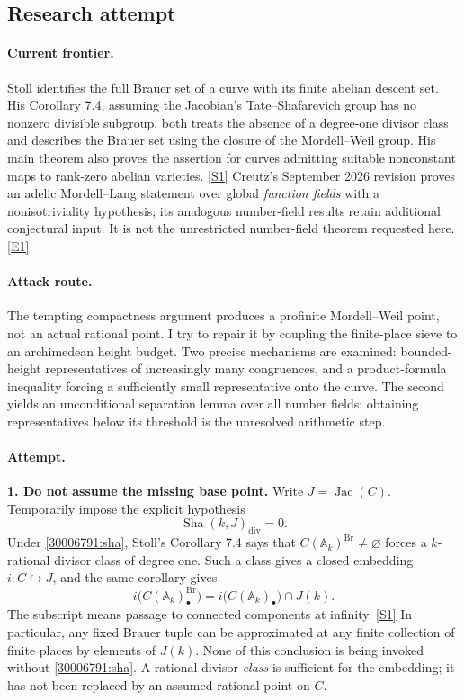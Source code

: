 \documentclass[11pt,a4paper]{article}
\newcommand{\A}{\mathbb{A}}
\newcommand{\sref}[2]{\hyperlink{source:#1:#2}{[S#2]}}
\newcommand{\eref}[2]{\hyperlink{extra:#1:#2}{[E#2]}}
\begin{document}
\subsection{Research attempt}

\paragraph{Current frontier.}
Stoll identifies the full Brauer set of a curve with its finite abelian
descent set. His Corollary 7.4, assuming the Jacobian's Tate--Shafarevich
group has no nonzero divisible subgroup, both treats the absence of a
degree-one divisor class and describes the Brauer set using the closure
of the Mordell--Weil group. His main theorem also proves the assertion for
curves admitting suitable nonconstant maps to rank-zero abelian varieties.
\sref{30006791}{1} Creutz's September 2026 revision proves an adelic
Mordell--Lang statement over global \emph{function fields} with a
nonisotriviality hypothesis; its analogous number-field results retain
additional conjectural input. It is not the unrestricted number-field
theorem requested here.\eref{30006791}{1}

\paragraph{Attack route.}
The tempting compactness argument produces a profinite Mordell--Weil point,
not an actual rational point. I try to repair it by coupling the finite-place
sieve to an archimedean height budget. Two precise mechanisms are examined:
bounded-height representatives of increasingly many congruences, and a
product-formula inequality forcing a sufficiently small representative
onto the curve. The second yields an unconditional separation lemma over
all number fields; obtaining representatives below its threshold is the
unresolved arithmetic step.

\paragraph{Attempt.}
\textbf{1. Do not assume the missing base point.}
Write $J=\operatorname{Jac}(C)$. Temporarily impose the explicit hypothesis
\begin{equation}\label{30006791:sha}
 \operatorname{Sha}(k,J)_{\mathrm{div}}=0.
\end{equation}
Under \eqref{30006791:sha}, Stoll's Corollary 7.4 says that
$C(\A_k)^{\operatorname{Br}}\ne\varnothing$ forces a $k$-rational divisor
class of degree one. Such a class gives a closed embedding $i:C\hookrightarrow J$,
and the same corollary gives
\[
 i\bigl(C(\A_k)^{\operatorname{Br}}_\bullet\bigr)
 =i\bigl(C(\A_k)_\bullet\bigr)\cap\overline{J(k)}.
\]
The subscript means passage to connected components at infinity.
\sref{30006791}{1} In particular, any fixed Brauer tuple can be approximated
at any finite collection of finite places by elements of $J(k)$.
None of this conclusion is being invoked without \eqref{30006791:sha}.
A rational divisor \emph{class} is sufficient for the embedding; it has
not been replaced by an assumed rational point on $C$.
\end{document}
